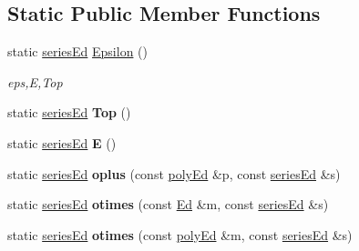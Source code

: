 \subsection*{Static Public Member Functions}
\begin{DoxyCompactItemize}
\item 
\mbox{\label{classetvo_i_i_1_1series_ed_a74175f2f194c76eaf1d7787d7f53be84}} 
static \mbox{\hyperlink{classetvo_i_i_1_1series_ed}{series\+Ed}} \mbox{\hyperlink{classetvo_i_i_1_1series_ed_a74175f2f194c76eaf1d7787d7f53be84}{Epsilon}} ()
\begin{DoxyCompactList}\small\item\em eps,E,Top \end{DoxyCompactList}\item 
\mbox{\label{classetvo_i_i_1_1series_ed_a6e082bdd4a46c1295f8f8617cbe6c188}} 
static \mbox{\hyperlink{classetvo_i_i_1_1series_ed}{series\+Ed}} {\bfseries Top} ()
\item 
\mbox{\label{classetvo_i_i_1_1series_ed_a5275f223d13fa265dccf44fe7f5d6e31}} 
static \mbox{\hyperlink{classetvo_i_i_1_1series_ed}{series\+Ed}} {\bfseries E} ()
\item 
\mbox{\label{classetvo_i_i_1_1series_ed_a40a45e15c5059beebf89aaf0718e3dde}} 
static \mbox{\hyperlink{classetvo_i_i_1_1series_ed}{series\+Ed}} {\bfseries oplus} (const \mbox{\hyperlink{classetvo_i_i_1_1poly_ed}{poly\+Ed}} \&p, const \mbox{\hyperlink{classetvo_i_i_1_1series_ed}{series\+Ed}} \&s)
\item 
\mbox{\label{classetvo_i_i_1_1series_ed_ac42a563c3bdea96b13440d0addd97cd6}} 
static \mbox{\hyperlink{classetvo_i_i_1_1series_ed}{series\+Ed}} {\bfseries otimes} (const \mbox{\hyperlink{classetvo_i_i_1_1_ed}{Ed}} \&m, const \mbox{\hyperlink{classetvo_i_i_1_1series_ed}{series\+Ed}} \&s)
\item 
\mbox{\label{classetvo_i_i_1_1series_ed_a2e1b7e671b1baba215d5399ebc137695}} 
static \mbox{\hyperlink{classetvo_i_i_1_1series_ed}{series\+Ed}} {\bfseries otimes} (const \mbox{\hyperlink{classetvo_i_i_1_1poly_ed}{poly\+Ed}} \&m, const \mbox{\hyperlink{classetvo_i_i_1_1series_ed}{series\+Ed}} \&s)

\end{DoxyCompactItemize}
